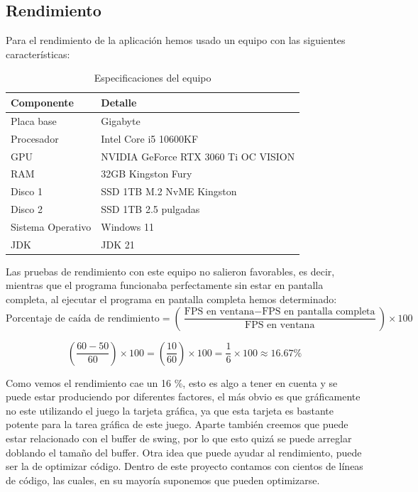 \documentclass[a4paper]{article}
\begin{document}
\subsection{Rendimiento}
Para el rendimiento de la aplicación hemos usado un equipo con las siguientes características:
\begin{table}[htbp]
    \centering
    \caption{Especificaciones del equipo}
    \begin{tabular}{|l|l|}
        \hline
        \textbf{Componente} & \textbf{Detalle}                     \\
        \hline
        Placa base          & Gigabyte                             \\
        Procesador          & Intel Core i5 10600KF                \\
        GPU                 & NVIDIA GeForce RTX 3060 Ti OC VISION \\
        RAM                 & 32GB Kingston Fury                   \\
        Disco 1             & SSD 1TB M.2  NvME Kingston           \\
        Disco 2             & SSD 1TB 2.5 pulgadas                 \\
        Sistema Operativo   & Windows 11                           \\
        JDK                 & JDK 21                               \\
        \hline
    \end{tabular}
    \label{tab:equipo}
\end{table}
Las pruebas de rendimiento con este equipo no salieron favorables, es decir, mientras que el programa funcionaba perfectamente sin estar en pantalla completa, al ejecutar el programa en pantalla completa hemos determinado:\\
\begin{equation}
    \text{Porcentaje de caída de rendimiento} = \left( \frac{\text{FPS en ventana} - \text{FPS en pantalla completa}}{\text{FPS en ventana}} \right) \times 100
\end{equation}

\begin{equation}
    \left(\frac{60 - 50}{60}\right)\times 100 = \left( \frac{10}{60} \right) \times 100 = \frac{1}{6} \times 100 \approx 16.67 \%
\end{equation}

Como vemos el rendimiento cae un 16 \%, esto es algo a tener en cuenta y se puede estar produciendo por diferentes factores, el más obvio es que gráficamente no este utilizando el juego la tarjeta gráfica, ya que esta tarjeta es bastante potente para la tarea gráfica de este juego.
Aparte también creemos que puede estar relacionado con el buffer de swing, por lo que esto quizá se puede arreglar doblando el tamaño del buffer. Otra idea que puede ayudar al rendimiento, puede ser la de optimizar código. Dentro
de este proyecto contamos con cientos de líneas de código, las cuales, en su mayoría suponemos que pueden optimizarse.
\end{document}

